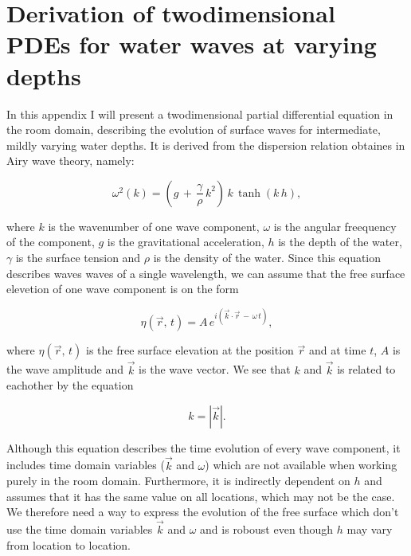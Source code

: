 \chapter{Derivation of twodimensional PDEs for water waves at varying depths}

In this appendix I will present a twodimensional partial differential equation in the room domain, describing the evolution of surface waves for intermediate, mildly varying water depths. It is derived from the dispersion relation obtaines in Airy wave theory, namely:

\begin{equation} \label{eq:dispersion}
\omega^2(k) = \left(g\,+\,\frac{\gamma}{\rho}\,k^2\right)\,k\,\tanh(k\,h),
\end{equation}

where $k$ is the wavenumber of one wave component, $\omega$ is the angular freequency of the component, $g$ is the gravitational acceleration, $h$ is the depth of the water, $\gamma$ is the surface tension and $\rho$ is the density of the water. Since this equation describes waves waves of a single wavelength, we can assume that the free surface elevetion of one wave component is on the form

\begin{equation} \label{eq:component}
\eta(\vec{r},\,t) = A\,e^{i(\vec{k}\cdot\vec{r}\,-\,\omega\,t)},
\end{equation}

where $\eta(\vec{r},\,t)$ is the free surface elevation at the position $\vec{r}$ and at time $t$, $A$ is the wave amplitude and $\vec{k}$ is the wave vector. We see that $k$ and $\vec{k}$ is related to eachother by the equation

\begin{equation} \label{eq:kvectok}
k = \left|\vec{k}\right|.
\end{equation}

Although this equation describes the time evolution of every wave component, it includes time domain variables ($\vec{k}$ and $\omega$) which are not available when working purely in the room domain. Furthermore, it is indirectly dependent on $h$ and assumes that it has the same value on all locations, which may not be the case. We therefore need a way to express the evolution of the free surface which don't use the time domain variables $\vec{k}$ and $\omega$ and is roboust even though $h$ may vary from location to location.

